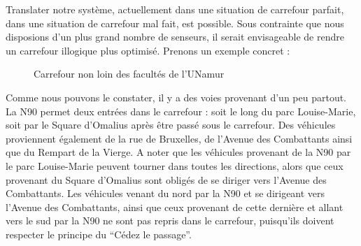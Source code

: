 Translater notre système, actuellement dans une situation de carrefour parfait, dans une situation de carrefour mal fait, est possible. Sous contrainte que nous disposions d’un plus grand nombre de senseurs, il serait envisageable de rendre un carrefour illogique plus optimisé. Prenons un exemple concret :

\begin{figure}[H]
    \begin{center}

        \caption{Carrefour non loin des facultés de l'UNamur}
    \end{center}
\end{figure}
\vspace{-0.5cm}
Comme nous pouvons le constater, il y a des voies provenant d’un peu partout. La N90 permet deux entrées dans le carrefour : soit le long du parc Louise-Marie, soit par le Square d’Omalius après être passé sous le carrefour. Des véhicules proviennent également de la rue de Bruxelles, de l’Avenue des Combattants ainsi que du Rempart de la Vierge. A noter que les véhicules provenant de la N90 par le parc Louise-Marie peuvent tourner dans toutes les directions, alors que ceux provenant du Square d’Omalius sont obligés de se diriger vers l’Avenue des Combattants. Les véhicules venant du nord par la N90 et se dirigeant vers l’Avenue des Combattants, ainsi que ceux provenant de cette dernière et allant vers le sud par la N90 ne sont pas repris dans le carrefour, puisqu’ils doivent respecter le principe du “Cédez le passage”.\\

